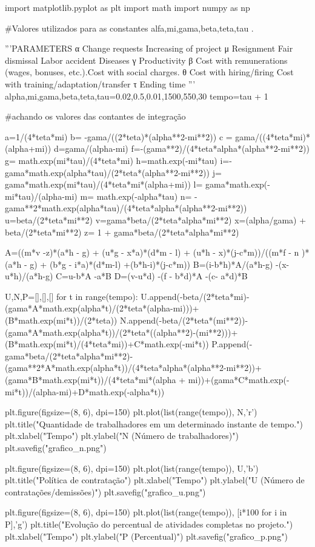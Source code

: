 \documentclass[14pt, oneside]{book}
\theoremstyle{definition}
\begin{document}
            \pagebreak
            \begin{python}
import matplotlib.pyplot as plt
import math
import numpy as np


#Valores utilizados para as constantes alfa,mi,gama,beta,teta,tau .

'''PARAMETERS
α Change requests Increasing of project
μ Resignment Fair dismissal Labor accident Diseases
γ Productivity
β Cost with remunerations (wages, bonuses, etc.).Cost with social charges.
θ Cost with hiring/firing Cost with training/adaptation/transfer
τ Ending time
'''
alpha,mi,gama,beta,teta,tau=0.02,0.5,0.01,1500,550,30
tempo=tau + 1


#achando os valores das contantes de integração

a=1/(4*teta*mi)
b= -gama/((2*teta)*(alpha**2-mi**2))
c = gama/((4*teta*mi)*(alpha+mi))
d=gama/(alpha-mi)
f=-(gama**2)/(4*teta*alpha*(alpha**2-mi**2))
g= math.exp(mi*tau)/(4*teta*mi)
h=math.exp(-mi*tau)
i=-gama*math.exp(alpha*tau)/(2*teta*(alpha**2-mi**2))
j= gama*math.exp(mi*tau)/(4*teta*mi*(alpha+mi))
l= gama*math.exp(-mi*tau)/(alpha-mi)
m= math.exp(-alpha*tau)
n= -gama**2*math.exp(alpha*tau)/(4*teta*alpha*(alpha**2-mi**2))
u=beta/(2*teta*mi**2)
v=gama*beta/(2*teta*alpha*mi**2)
x=(alpha/gama) + beta/(2*teta*mi**2)
z= 1 + gama*beta/(2*teta*alpha*mi**2)



A=((m*v -z)*(a*h - g) + (u*g - x*a)*(d*m - l) + (u*h - x)*(j-c*m))/((m*f - n
)*(a*h - g) + (b*g - i*a)*(d*m-l) +(b*h-i)*(j-c*m))
B=(i-b*h)*A/(a*h-g) -(x-u*h)/(a*h-g)
C=u-b*A -a*B
D=(v-u*d) -(f - b*d)*A -(c- a*d)*B




U,N,P=[],[],[]
for t in range(tempo):
    U.append(-beta/(2*teta*mi)-(gama*A*math.exp(alpha*t)/(2*teta*(alpha-mi)))+(B*math.exp(mi*t))/(2*teta))
    N.append(-beta/(2*teta*(mi**2))-(gama*A*math.exp(alpha*t))/(2*teta*((alpha**2)-(mi**2)))+(B*math.exp(mi*t)/(4*teta*mi))+C*math.exp(-mi*t))
    P.append(-gama*beta/(2*teta*alpha*mi**2)-(gama**2*A*math.exp(alpha*t))/(4*teta*alpha*(alpha**2-mi**2))+
        (gama*B*math.exp(mi*t))/(4*teta*mi*(alpha + mi))+(gama*C*math.exp(-mi*t))/(alpha-mi)+D*math.exp(-alpha*t))



plt.figure(figsize=(8, 6), dpi=150)
plt.plot(list(range(tempo)), N,'r')
plt.title("Quantidade de trabalhadores em um determinado instante de tempo.")
plt.xlabel("Tempo")
plt.ylabel("N (Número de trabalhadores)")
plt.savefig("grafico_n.png")

plt.figure(figsize=(8, 6), dpi=150)
plt.plot(list(range(tempo)), U,'b')
plt.title("Política de contratação")
plt.xlabel("Tempo")
plt.ylabel("U (Número de contratações/demissões)")
plt.savefig("grafico_u.png")

plt.figure(figsize=(8, 6), dpi=150)
plt.plot(list(range(tempo)), [i*100 for i in P],'g')
plt.title("Evolução do percentual de atividades completas no projeto.")
plt.xlabel("Tempo")
plt.ylabel("P (Percentual)")
plt.savefig("grafico_p.png")

            \end{python}
            
\end{document}
